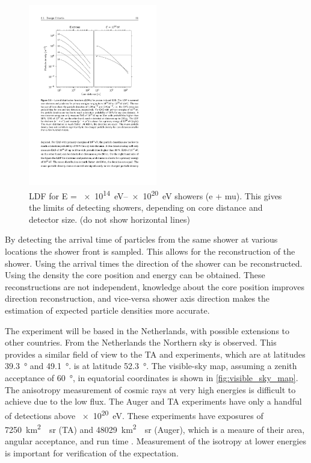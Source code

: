 \begin{figure}
    \centering
    \includegraphics[width=0.5\textwidth]
                    {plots/cosmic-rays/ldf_energies}
    \caption{LDF for E = \SIrange{e14}{e20}{\eV} showers (e + mu). This gives the limits of detecting showers, depending on core distance and detector size. (do not show horizontal lines)}
    \label{fig:ldf_energies}
\end{figure}

By detecting the arrival time of particles from the same shower at various locations the shower front is sampled. This allows for the reconstruction of the shower. Using the arrival times the direction of the shower can be reconstructed. Using the density the core position and energy can be obtained. These reconstructions are not independent, knowledge about the core position improves direction reconstruction, and vice-versa shower axis direction makes the estimation of expected particle densities more accurate.

The experiment will be based in the Netherlands, with possible extensions to other countries. From the Netherlands the Northern sky is observed. This provides a similar field of view to the TA and \kascade experiments, which are at latitudes \SI{39.3}{\degree} and \SI{49.1}{\degree}. \nikhef is at latitude \SI{52.3}{\degree}. The visible-sky map, assuming a zenith acceptance of \SI{60}{\degree}, in equatorial coordinates is shown in \cref{fig:visible_sky_map}. The anisotropy measurement of cosmic rays at very high energies is difficult to achieve due to the low flux. The Auger and TA experiments have only a handful of detections above \SI{e20}{\eV}. These experiments have exposures of \SI{7250}{\kilo\meter\squared\year\steradian} (TA) and \SI{48029}{\kilo\meter\squared\year\steradian} (Auger), which is a meaure of their area, angular acceptance, and run time \cite{abbasi2015combined}. Measurement of the isotropy at lower energies is important for verification of the expectation.

